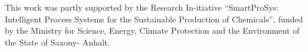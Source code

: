 This work was partly supported by the Research In-itiative “SmartProSys: Intelligent Process Systems for the Sustainable Production of Chemicals”, funded by the Ministry for Science, Energy, Climate Protection and the Environment of the State of Saxony- Anhalt.